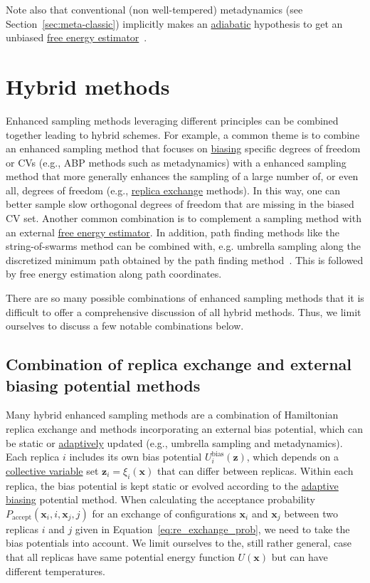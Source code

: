 \documentclass[9pt,review]{livecoms}
\newcommand{\vx}{\mathbf{x}}
\newcommand{\vz}{\mathbf{z}}
\begin{document}
Note also that conventional (non well-tempered) metadynamics (see Section~\ref{sec:meta-classic}) implicitly makes an \hyperlink{ref:AdiabaticDyn} {adiabatic} hypothesis to get an unbiased \hyperlink{ref:FEestimator} {free energy estimator}~\cite{laio-gervasio-08, jourdain-lelievre-zitt-21}.


\section{Hybrid methods}
\label{sec:hybrids}

Enhanced sampling methods leveraging different principles can be combined together leading to hybrid schemes.
For example, a common theme is to combine an enhanced sampling method that focuses on \hyperlink{ref:biasingE} {biasing} specific degrees of freedom or CVs (e.g., ABP methods such as metadynamics) with a enhanced sampling method that more generally enhances the sampling of a large number of, or even all, degrees of freedom (e.g., \hyperlink{ref:ReplEx} {replica exchange} methods). In this way, one can better sample slow orthogonal degrees of freedom that are missing in the biased CV set.
Another common combination is to complement a sampling method with an external \hyperlink{ref:FEestimator} {free energy estimator}.
In addition, path finding methods like the string-of-swarms method can be combined with, e.g. umbrella sampling along the discretized minimum path obtained by the path finding method~\cite{doi:10.1021/jp0777059}. This is followed by free energy estimation along path coordinates.

There are so many possible combinations of enhanced sampling methods that it is difficult to offer a comprehensive discussion of all hybrid methods. Thus, we limit ourselves to discuss a few notable combinations below.


\subsection{Combination of replica exchange and external biasing potential methods}

Many hybrid enhanced sampling methods are a combination of Hamiltonian replica exchange and methods incorporating an external bias potential, which can be static or \hyperlink{ref:Adaptive} {adaptively} updated (e.g., umbrella sampling and metadynamics). Each replica $i$ includes its own bias potential $U^{\mathrm{bias}}_{i}(\vz)$, which depends on a \hyperlink{ref:CV} {collective variable} set $\vz_{i} = \xi_{i}(\vx)$ that can differ between replicas. Within each replica, the bias potential is kept static or evolved according to the \hyperlink{ref:Adaptive} {adaptive} \hyperlink{ref:biasingE} {biasing} potential method. When calculating the acceptance probability $P_\mathrm{accept}(\vx_i, i, \vx_j, j)$ for an exchange of configurations $\vx_{i}$ and $\vx_{j}$ between two replicas $i$ and $j$ given in Equation~\ref{eq:re_exchange_prob}, we need to take the bias potentials into account. We limit ourselves to the, still rather general, case that all replicas have same potential energy function $U(\vx)$ but can have different temperatures.
\end{document}
